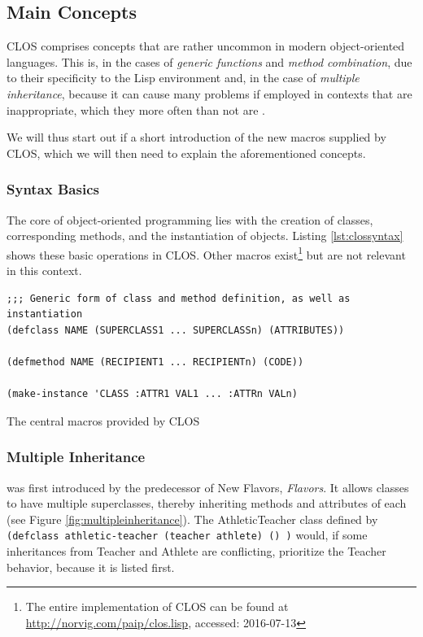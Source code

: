 \documentclass[oribibl]{llncs}
\begin{document}
\subsection{Main Concepts}
\label{sec:concepts}

CLOS comprises concepts that are rather uncommon in modern object-oriented languages. This is, in the cases of \emph{generic functions} and \emph{method combination}, due to their specificity to the Lisp environment and, in the case of \emph{multiple inheritance}, because it can cause many problems if employed in contexts that are inappropriate, which they more often than not are \cite{cargill1993case}.  

We will thus start out if a short introduction of the new macros supplied by CLOS, which we will then need to explain the aforementioned concepts.


\subsubsection{Syntax Basics}
The core of object-oriented programming lies with the creation of classes, corresponding methods, and the instantiation of objects. Listing \ref{lst:clossyntax} shows these basic operations in CLOS. Other macros exist\footnote{The entire implementation of CLOS can be found at \url{http://norvig.com/paip/clos.lisp}, accessed: 2016-07-13} but are not relevant in this context.

\begin{listing}[]%
\begin{verbatim}
;;; Generic form of class and method definition, as well as instantiation
(defclass NAME (SUPERCLASS1 ... SUPERCLASSn) (ATTRIBUTES))

(defmethod NAME (RECIPIENT1 ... RECIPIENTn) (CODE))

(make-instance 'CLASS :ATTR1 VAL1 ... :ATTRn VALn)
\end{verbatim}
\caption{The central macros provided by CLOS}
\label{lst:clossyntax}
\end{listing}


\subsubsection{Multiple Inheritance}
\label{sec:mulinh}
was first introduced by the predecessor of New Flavors, \emph{Flavors}. It allows classes to have multiple superclasses, thereby inheriting methods and attributes of each (see Figure \ref{fig:multipleinheritance}). The AthleticTeacher class defined by \texttt{(defclass athletic-teacher (teacher athlete) () )} would, if some inheritances from Teacher and Athlete are conflicting, prioritize the Teacher behavior, because it is listed first.  
\end{document}
